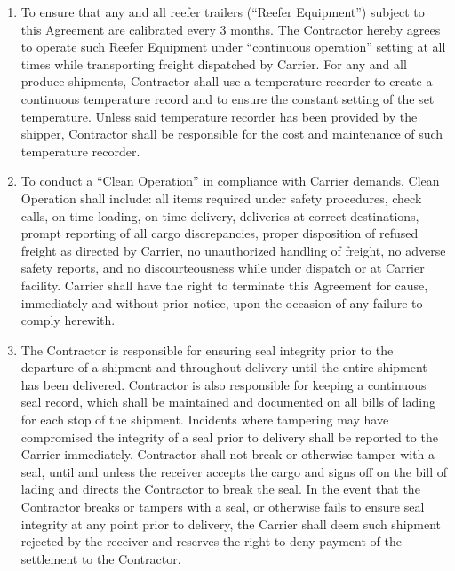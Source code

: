 {\begin{enumerate}[
        ref = \SecondLevelEnumerator
    ]
        \item To ensure that any and all reefer trailers (``Reefer
        Equipment'') subject to this Agreement are calibrated every 3
        months. The Contractor hereby agrees to operate such Reefer
        Equipment under ``continuous operation'' setting at all times while
        transporting freight dispatched by Carrier. For any and all produce
        shipments, Contractor shall use a temperature recorder to create a
        continuous temperature record and to ensure the constant setting of
        the set temperature. Unless said temperature recorder has been
        provided by the shipper, Contractor shall be responsible for the
        cost and maintenance of such temperature recorder.

        \item To conduct a ``Clean Operation'' in compliance with Carrier
        demands. Clean Operation shall include: all items required under
        safety procedures, check calls, on-time loading, on-time delivery,
        deliveries at correct destinations, prompt reporting of all cargo
        discrepancies, proper disposition of refused freight as directed by
        Carrier, no unauthorized handling of freight, no adverse safety
        reports, and no discourteousness while under dispatch or at Carrier
        facility. Carrier shall have the right to terminate this Agreement
        for cause, immediately and without prior notice, upon the occasion
        of any failure to comply herewith.

        \item The Contractor is responsible for ensuring seal integrity
        prior to the departure of a shipment and throughout delivery until
        the entire shipment has been delivered. Contractor is also
        responsible for keeping a continuous seal record, which shall be
        maintained and documented on all bills of lading for each stop of
        the shipment. Incidents where tampering may have compromised the
        integrity of a seal prior to delivery shall be reported to the
        Carrier immediately. Contractor shall not break or otherwise tamper
        with a seal, until and unless the receiver accepts the cargo and
        signs off on the bill of lading and directs the Contractor to break
        the seal. In the event that the Contractor breaks or tampers with a
        seal, or otherwise fails to ensure seal integrity at any point
        prior to delivery, the Carrier shall deem such shipment rejected by
        the receiver and reserves the right to deny payment of the
        settlement to the Contractor.


\end{enumerate}}
